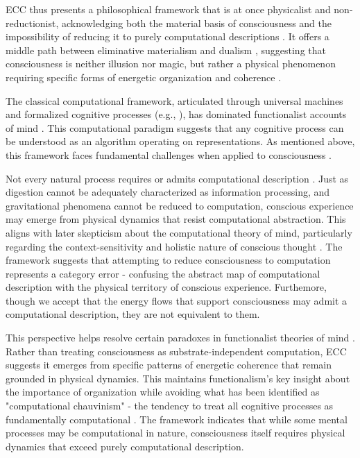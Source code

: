 \begin{refsection}
ECC thus presents a philosophical framework that is at once physicalist and non-reductionist, acknowledging both the material basis of consciousness and the impossibility of reducing it to purely computational descriptions \cite{horst2011symbols}. It offers a middle path between eliminative materialism \cite{churchland1986neurophilosophy} and dualism \cite{chalmers1997conscious}, suggesting that consciousness is neither illusion nor magic, but rather a physical phenomenon requiring specific forms of energetic organization and coherence \cite{jonas2001phenomenon}.

The classical computational framework, articulated through universal machines \cite{turing1936computable} and formalized cognitive processes (e.g., \cite{marr1982vision}), has dominated functionalist accounts of mind \cite{putnam1988representation}. This computational paradigm suggests that any cognitive process can be understood as an algorithm operating on representations. As mentioned above, this framework faces fundamental challenges when applied to consciousness \cite{fodor2000mind}.

Not every natural process requires or admits computational description \cite{rosen1991life}. Just as digestion cannot be adequately characterized as information processing, and gravitational phenomena cannot be reduced to computation, conscious experience may emerge from physical dynamics that resist computational abstraction. This aligns with later skepticism about the computational theory of mind, particularly regarding the context-sensitivity and holistic nature of conscious thought \cite{gibson2014ecological}. The framework suggests that attempting to reduce consciousness to computation represents a category error - confusing the abstract map of computational description with the physical territory of conscious experience. Furthemore, though we accept that the energy flows that support consciousness may admit a computational description, they are not equivalent to them.

This perspective helps resolve certain paradoxes in functionalist theories of mind \cite{piccinini2020neurocognitive}. Rather than treating consciousness as substrate-independent computation, ECC suggests it emerges from specific patterns of energetic coherence that remain grounded in physical dynamics. This maintains functionalism's key insight about the importance of organization while avoiding what has been identified as "computational chauvinism" - the tendency to treat all cognitive processes as fundamentally computational \cite{bishop2009computers}. The framework indicates that while some mental processes may be computational in nature, consciousness itself requires physical dynamics that exceed purely computational description.


\end{refsection}
